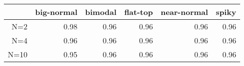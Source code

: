 \begin{tabular}{rrrrrr}
  \toprule  & big-normal & bimodal & flat-top & near-normal & spiky \\ 
  \midrule N=2 & 0.98 & 0.96 & 0.96 & 0.96 & 0.96 \\ 
  N=4 & 0.96 & 0.96 & 0.96 & 0.96 & 0.96 \\ 
  N=10 & 0.95 & 0.96 & 0.96 & 0.96 & 0.96 \\ 
   \bottomrule \end{tabular}

